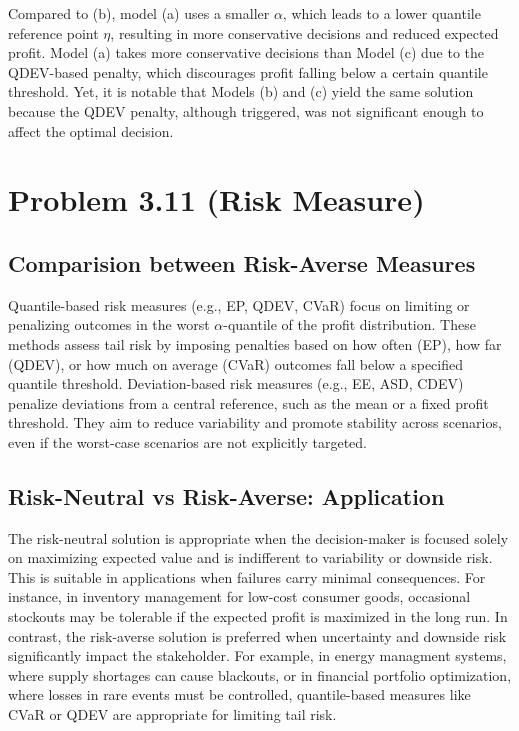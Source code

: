\documentclass[7pt]{article}
\begin{document}
Compared to (b), model (a) uses a smaller $\alpha$, which leads to a lower
quantile reference point $\eta$, resulting in more conservative decisions and
reduced expected profit. Model (a) takes more conservative decisions than Model
(c) due to the QDEV-based penalty, which discourages profit falling below a
certain quantile threshold. Yet, it is notable that Models (b) and (c) yield
the same solution because the QDEV penalty, although triggered, was not
significant enough to affect the optimal decision.

\section{Problem 3.11 (Risk Measure)}

\subsection{Comparision between Risk-Averse Measures}
Quantile-based risk measures (e.g., EP, QDEV, CVaR) focus on limiting or
penalizing outcomes in the worst $\alpha$-quantile of the profit distribution.
These methods assess tail risk by imposing penalties based on how often (EP),
how far (QDEV), or how much on average (CVaR) outcomes fall below a specified
quantile threshold. Deviation-based risk measures (e.g., EE, ASD, CDEV)
penalize deviations from a central reference, such as the mean or a fixed
profit threshold. They aim to reduce variability and promote stability across
scenarios, even if the worst-case scenarios are not explicitly targeted.

\subsection{Risk-Neutral vs Risk-Averse: Application}

The risk-neutral solution is appropriate when the decision-maker is focused
solely on maximizing expected value and is indifferent to variability or
downside risk. This is suitable in applications when failures carry minimal
consequences. For instance, in inventory management for low-cost consumer
goods, occasional stockouts may be tolerable if the expected profit is
maximized in the long run. In contrast, the risk-averse solution is preferred
when uncertainty and downside risk significantly impact the stakeholder. For
example, in energy managment systems, where supply shortages can cause
blackouts, or in financial portfolio optimization, where losses in rare events
must be controlled, quantile-based measures like CVaR or QDEV are appropriate
for limiting tail risk.
\end{document}
